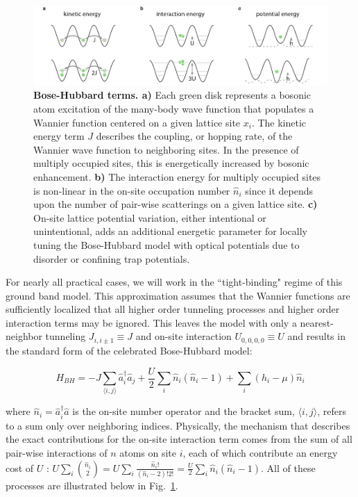 \begin{figure}[t!]
		\includegraphics[width=\columnwidth]{figures/ch1/bh_cartoons/bh_cartoon.pdf} 
		\caption{\textbf{Bose-Hubbard terms. a)} Each green disk represents a bosonic atom excitation of the many-body wave function that populates a Wannier function centered on a given lattice site $x_i$. The kinetic energy term $J$ describes the coupling, or hopping rate, of the Wannier wave function to neighboring sites. In the presence of multiply occupied sites, this is energetically increased by bosonic enhancement. \textbf{b)} The interaction energy for multiply occupied sites is non-linear in the on-site occupation number $\hat{n}_i$ since it depends upon the number of pair-wise scatterings on a given lattice site. \textbf{c)} On-site lattice potential variation, either intentional or unintentional, adds an additional energetic parameter for locally tuning the Bose-Hubbard model with optical potentials due to disorder or confining trap potentials.}
		\label{fig:BHCartoon}	
\end{figure}

For nearly all practical cases, we will work in the ``tight-binding" regime of this ground band model. This approximation assumes that the Wannier functions are sufficiently localized that all higher order tunneling processes and higher order interaction terms may be ignored. This leaves the model with only a nearest-neighbor tunneling $J_{i,i\pm1}\equiv J$ and on-site interaction $U_{0,0,0,0}\equiv U$ and results in the standard form of the celebrated Bose-Hubbard model:

\begin{equation}
H_{BH} = - J \sum_{\langle i,j \rangle} \hat{a}^\dagger_i \hat{a}_j + \frac{U}{2} \sum_i \hat{n}_i (\hat{n}_i-1) + \sum_i (h_i - \mu) \hat{n}_i
\label{eqn:BHC}
\end{equation}

where $\hat{n}_i = \hat{a}_i^\dagger \hat{a}$ is the on-site number operator and the bracket sum, $\langle i,j \rangle$, refers to a sum only over neighboring indices. Physically, the mechanism that describes the exact contributions for the on-site interaction term comes from the sum of all pair-wise interactions of $n$ atoms on site $i$, each of which contribute an energy cost of $U$ : $U \sum_i {\hat{n}_i \choose 2} = U \sum_i \frac{\hat{n}_i!}{(\hat{n}_i-2)! 2!} = \frac{U}{2} \sum_i \hat{n}_i \left ( \hat{n}_i-1\right )$. All of these processes are illustrated below in Fig.~\ref{fig:BHCartoon}.

